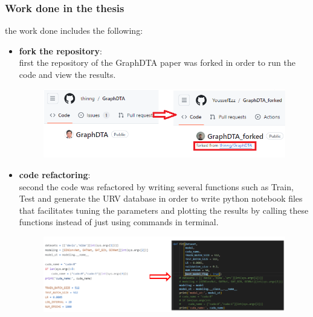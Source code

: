 \documentclass[11pt, a4paper]{article}
\begin{document}
            \subsubsection{Work done in the thesis}
            the work done includes the following:
            \begin{itemize}
                \item \textbf{fork the repository}: 
                \\first the repository of the GraphDTA paper was forked in order to run the code and view the results.
                \begin{figure}[H]
                    \centering
                    \begin{minipage}{0.7\textwidth}
                    \includegraphics[width=\textwidth]{fork.PNG}
                    \end{minipage}   
                \end{figure}

                \item \textbf{code refactoring}: 
                \\second the code was refactored by writing several functions such as Train, Test and generate the URV database in order to write python notebook files that facilitates tuning the parameters and plotting the results by calling these functions instead of just using commands in terminal.
                \begin{figure}[H]
                    \centering
                    \begin{minipage}{0.8\textwidth}
                    \includegraphics[width=\textwidth]{refactor.png}
                    \end{minipage}   
                \end{figure}

                \end{itemize}
\end{document}
